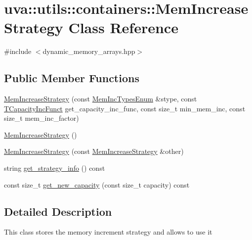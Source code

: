 \hypertarget{classuva_1_1utils_1_1containers_1_1_mem_increase_strategy}{}\section{uva\+:\+:utils\+:\+:containers\+:\+:Mem\+Increase\+Strategy Class Reference}
\label{classuva_1_1utils_1_1containers_1_1_mem_increase_strategy}


{\ttfamily \#include $<$dynamic\+\_\+memory\+\_\+arrays.\+hpp$>$}

\subsection*{Public Member Functions}
\begin{DoxyCompactItemize}
\item 
\hyperlink{classuva_1_1utils_1_1containers_1_1_mem_increase_strategy_a455d9e997bbe60f3af9f46f9c80ed3df}{Mem\+Increase\+Strategy} (const \hyperlink{namespaceuva_1_1utils_1_1containers_aea6a0a858974dd7edb4227dcbcbc1eb6}{Mem\+Inc\+Types\+Enum} \&stype, const \hyperlink{namespaceuva_1_1utils_1_1containers_ab6acd1b6093503e17f6d8b942e9fccf1}{T\+Capacity\+Inc\+Funct} get\+\_\+capacity\+\_\+inc\+\_\+func, const size\+\_\+t min\+\_\+mem\+\_\+inc, const size\+\_\+t mem\+\_\+inc\+\_\+factor)
\item 
\hyperlink{classuva_1_1utils_1_1containers_1_1_mem_increase_strategy_a045e831007bb7d51db3dc527c1dde722}{Mem\+Increase\+Strategy} ()
\item 
\hyperlink{classuva_1_1utils_1_1containers_1_1_mem_increase_strategy_aaab90bd04f638c338da6ecb779f6a953}{Mem\+Increase\+Strategy} (const \hyperlink{classuva_1_1utils_1_1containers_1_1_mem_increase_strategy}{Mem\+Increase\+Strategy} \&other)
\item 
string \hyperlink{classuva_1_1utils_1_1containers_1_1_mem_increase_strategy_aa491d55587dbe22b297bb3ac3cedbab6}{get\+\_\+strategy\+\_\+info} () const 
\item 
const size\+\_\+t \hyperlink{classuva_1_1utils_1_1containers_1_1_mem_increase_strategy_a0e7e850602c6884cfb574ad90c3a7639}{get\+\_\+new\+\_\+capacity} (const size\+\_\+t capacity) const 
\end{DoxyCompactItemize}


\subsection{Detailed Description}
This class stores the memory increment strategy and allows to use it 


